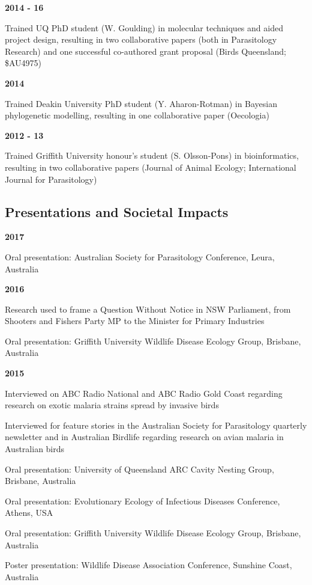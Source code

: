 \documentclass[]{article}
\begin{document}
\textbf{2014 - 16}

Trained UQ PhD student (W. Goulding) in molecular techniques and aided
project design, resulting in two collaborative papers (both in
Parasitology Research) and one successful co-authored grant proposal
(Birds Queensland; \$AU4975)

\textbf{2014}

Trained Deakin University PhD student (Y. Aharon-Rotman) in Bayesian
phylogenetic modelling, resulting in one collaborative paper (Oecologia)

\textbf{2012 - 13}

Trained Griffith University honour's student (S. Olsson-Pons) in
bioinformatics, resulting in two collaborative papers (Journal of Animal
Ecology; International Journal for Parasitology)

\subsection{Presentations and Societal
Impacts}\label{presentations-and-societal-impacts}

\textbf{2017}

Oral presentation: Australian Society for Parasitology Conference,
Leura, Australia

\textbf{2016}

Research used to frame a Question Without Notice in NSW Parliament, from
Shooters and Fishers Party MP to the Minister for Primary Industries

Oral presentation: Griffith University Wildlife Disease Ecology Group,
Brisbane, Australia

\textbf{2015}

Interviewed on ABC Radio National and ABC Radio Gold Coast regarding
research on exotic malaria strains spread by invasive birds

Interviewed for feature stories in the Australian Society for
Parasitology quarterly newsletter and in Australian Birdlife regarding
research on avian malaria in Australian birds

Oral presentation: University of Queensland ARC Cavity Nesting Group,
Brisbane, Australia

Oral presentation: Evolutionary Ecology of Infectious Diseases
Conference, Athens, USA

Oral presentation: Griffith University Wildlife Disease Ecology Group,
Brisbane, Australia

Poster presentation: Wildlife Disease Association Conference, Sunshine
Coast, Australia
\end{document}
